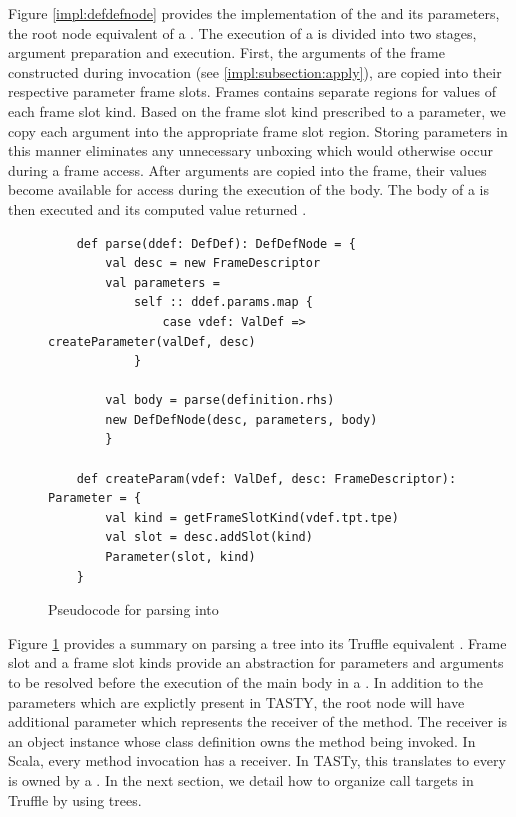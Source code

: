 Figure \ref{impl:defdefnode} provides the implementation of the  and its parameters, the root node equivalent of a .
The execution of a  is divided into two stages, argument preparation and execution.
First, the arguments of the frame constructed during invocation (see \ref{impl:subsection:apply}), are copied into their respective parameter frame slots.
Frames contains separate regions for values of each frame slot kind.
Based on the frame slot kind prescribed to a parameter, we copy each argument into the appropriate frame slot region.
Storing parameters in this manner eliminates any unnecessary unboxing which would otherwise occur during a frame access.
After arguments are copied into the frame, their values become available for access during the execution of the body.
The body of a  is then executed and its computed value returned .

\begin{figure}[!htb]
	\begin{verbatim}
	def parse(ddef: DefDef): DefDefNode = {
		val desc = new FrameDescriptor
		val parameters = 
			self :: ddef.params.map {
				case vdef: ValDef => createParameter(valDef, desc)
			}
			
		val body = parse(definition.rhs)
		new DefDefNode(desc, parameters, body)
		}
		
	def createParam(vdef: ValDef, desc: FrameDescriptor): Parameter = {
		val kind = getFrameSlotKind(vdef.tpt.tpe)
		val slot = desc.addSlot(kind)
		Parameter(slot, kind)
	}
	\end{verbatim}
	\caption{Pseudocode for parsing  into }
	\label{impl:parse-defdef}
\end{figure}

Figure \ref{impl:parse-defdef} provides a summary on parsing a  tree into its Truffle equivalent .
Frame slot and a frame slot kinds provide an abstraction for parameters and arguments to be resolved before the execution of the main body in a .
In addition to the parameters which are explictly present in TASTY, the root node will have additional parameter which represents the receiver of the method.
The receiver is an object instance whose class definition owns the method being invoked.
In Scala, every method invocation has a receiver.
In TASTy, this translates to every  is owned by a .
In the next section, we detail how to organize call targets in Truffle by using  trees.

